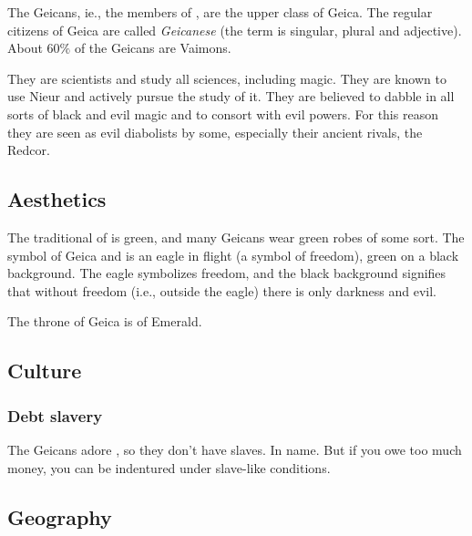 The Geicans, ie., the members of \ClanGeican, are the upper class of Geica. The regular citizens of Geica are called \emph{Geicanese} (the term is singular, plural and adjective). About $60\%$ of the Geicans are Vaimons. 

They are scientists and study all sciences, including magic. They are known to use Nieur and actively pursue the study of it. 
They are believed to dabble in all sorts of black and evil magic and to consort with evil powers. 
For this reason they are seen as evil diabolists by some, especially their ancient rivals, the Redcor. 









\subsection{Aesthetics}
The traditional \colour of \ClanGeican is green, and many Geicans wear green robes of some sort. 
The symbol of Geica and \ClanGeican is an eagle in flight (a symbol of freedom), green on a black background. 
The eagle symbolizes freedom, and the black background signifies that without freedom (i.e., outside the eagle) there is only darkness and evil. 

The throne of Geica is of Emerald. 









\subsection{Culture}





\subsubsection{Debt slavery}
The Geicans adore , so they don't have slaves. 
In name. 
But if you owe too much money, you can be indentured under slave-like conditions. 









\subsection{Geography}
